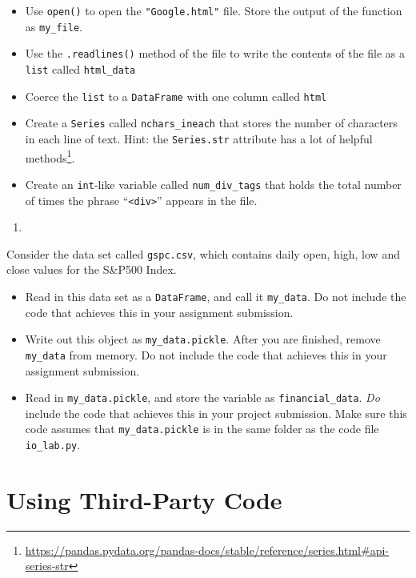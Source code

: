 \documentclass[
  12pt,
  krantz2]{krantz}
\providecommand{\tightlist}{%
  \setlength{\itemsep}{0pt}\setlength{\parskip}{0pt}}
\renewcommand{\href}[2]{#2\footnote{\url{#1}}}
\begin{document}
\begin{itemize}
\tightlist
\item
  Use \texttt{open()} to open the \texttt{"Google.html"} file. Store the output of the function as \texttt{my\_file}.
\item
  Use the \texttt{.readlines()} method of the file to write the contents of the file as a \texttt{list} called \texttt{html\_data}
\item
  Coerce the \texttt{list} to a \texttt{DataFrame} with one column called \texttt{html}
\item
  Create a \texttt{Series} called \texttt{nchars\_ineach} that stores the number of characters in each line of text. Hint: the \href{https://pandas.pydata.org/pandas-docs/stable/reference/series.html\#api-series-str}{\texttt{Series.str} attribute has a lot of helpful methods}.
\item
  Create an \texttt{int}-like variable called \texttt{num\_div\_tags} that holds the total number of times the phrase ``\texttt{\textless{}div\textgreater{}}'' appears in the file.
\end{itemize}

\begin{enumerate}
\def\labelenumi{\arabic{enumi}.}
\setcounter{enumi}{1}
\tightlist
\item
\end{enumerate}

Consider the data set called \texttt{gspc.csv}, which contains daily open, high, low and close values for the S\&P500 Index.

\begin{itemize}
\tightlist
\item
  Read in this data set as a \texttt{DataFrame}, and call it \texttt{my\_data}. Do not include the code that achieves this in your assignment submission.
\item
  Write out this object as \texttt{my\_data.pickle}. After you are finished, remove \texttt{my\_data} from memory. Do not include the code that achieves this in your assignment submission.
\item
  Read in \texttt{my\_data.pickle}, and store the variable as \texttt{financial\_data}. \emph{Do} include the code that achieves this in your project submission. Make sure this code assumes that \texttt{my\_data.pickle} is in the same folder as the code file \texttt{io\_lab.py}.
\end{itemize}

\hypertarget{using-third-party-code}{%
\chapter{Using Third-Party Code}\label{using-third-party-code}}
\end{document}
